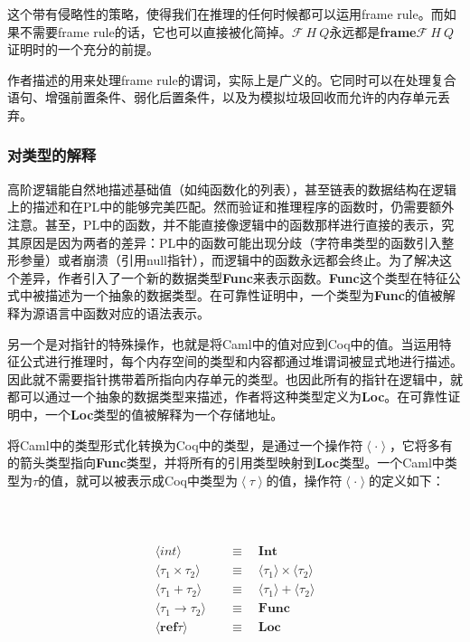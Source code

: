 \documentclass[a4paper,11pt]{article}
\begin{document}
这个带有侵略性的策略，使得我们在推理的任何时候都可以运用frame rule。而如果不需要frame rule的话，它也可以直接被化简掉。$\mathcal{F}~H~Q$永远都是\textbf{frame}$\mathcal{F}~H~Q$证明时的一个充分的前提。

作者描述的用来处理frame rule的谓词，实际上是广义的。它同时可以在处理复合语句、增强前置条件、弱化后置条件，以及为模拟垃圾回收而允许的内存单元丢弃。



\subsubsection{对类型的解释}
高阶逻辑能自然地描述基础值（如纯函数化的列表），甚至链表的数据结构在逻辑上的描述和在PL中的能够完美匹配。然而验证和推理程序的函数时，仍需要额外注意。甚至，PL中的函数，并不能直接像逻辑中的函数那样进行直接的表示，究其原因是因为两者的差异：PL中的函数可能出现分歧（字符串类型的函数引入整形参量）或者崩溃（引用null指针），而逻辑中的函数永远都会终止。为了解决这个差异，作者引入了一个新的数据类型\textbf{Func}来表示函数。\textbf{Func}这个类型在特征公式中被描述为一个抽象的数据类型。在可靠性证明中，一个类型为\textbf{Func}的值被解释为源语言中函数对应的语法表示。

另一个是对指针的特殊操作，也就是将Caml中的值对应到Coq中的值。当运用特征公式进行推理时，每个内存空间的类型和内容都通过堆谓词被显式地进行描述。因此就不需要指针携带着所指向内存单元的类型。也因此所有的指针在逻辑中，就都可以通过一个抽象的数据类型来描述，作者将这种类型定义为\textbf{Loc}。在可靠性证明中，一个\textbf{Loc}类型的值被解释为一个存储地址。

将Caml中的类型形式化转换为Coq中的类型，是通过一个操作符$\left \langle \cdot \right \rangle$，它将多有的箭头类型指向\textbf{Func}类型，并将所有的引用类型映射到\textbf{Loc}类型。一个Caml中类型为$\tau$的值，就可以被表示成Coq中类型为$\left \langle \tau \right \rangle$的值，操作符$\left \langle \cdot \right \rangle$的定义如下：
~\\
~\\
~\\~\\
\begin{align*}
	\langle int \rangle \quad & \equiv \quad \mathbf{Int}\\
  \langle \tau_1 \times \tau_2 \rangle \quad & \equiv \quad \langle \tau_1  \rangle \times  \langle \tau_2 \rangle \\
	\langle \tau_1 + \tau_2 \rangle \quad & \equiv \quad \langle \tau_1  \rangle + \langle \tau_2 \rangle \\
	\langle \tau_1 \to \tau_2 \rangle \quad & \equiv \quad \mathbf{Func}\\
	\langle \mathbf{ref} \tau \rangle \quad & \equiv \quad \mathbf{Loc}
\end{align*}
\end{document}
